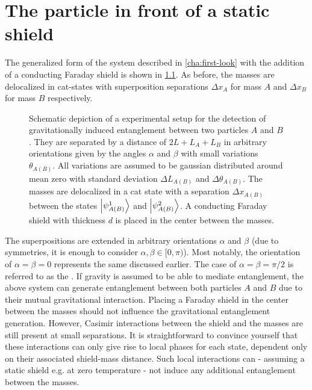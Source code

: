 \chapter{The particle in front of a static shield}\label{cha:entanglement-generation}

The generalized form of the system described in \cref{cha:first-look} with the addition of a conducting Faraday shield is shown in \cref{fig:4:complete-setup}. As before, the masses are delocalized in cat-states with superposition separations $\Delta x_A$ for mass $A$ and $\Delta x_B$ for mass $B$ respectively.
\begin{figure}[!htbp]
  \centering
  \def\svgwidth{\textwidth}
  
  \caption{Schematic depiction of a experimental setup for the detection of gravitationally induced entanglement between two particles $A$ and $B$. They are separated by a distance of $2L + L_A + L_B$ in arbitrary orientations given by the angles $\alpha$ and $\beta$ with small variations $\theta_{A(B)}$. All variations are assumed to be gaussian distributed around mean zero with standard deviation $\Delta L_{A(B)}$ and $\Delta \theta_{A(B)}$. The masses are delocalized in a cat state with a separation $\Delta x_{A(B)}$ between the states $\ket{\psi_{A(B)}^1}$ and $\ket{\psi_{A(B)}^2}$. A conducting Faraday shield with thickness $d$ is placed in the center between the masses.}
  \label{fig:4:complete-setup}
\end{figure}
The superpositions are extended in arbitrary orientations $\alpha$ and $\beta$ (due to symmetries, it is enough to consider $\alpha, \beta \in [0, \pi)$). Most notably, the orientation of $\alpha = \beta = 0$ represents the same  discussed earlier. 
The case of $\alpha = \beta = \pi/2$ is referred to as the .
If gravity is assumed to be able to mediate entanglement, the above system can generate entanglement between both particles $A$ and $B$ due to their mutual gravitational interaction.
Placing a Faraday shield in the center between the masses should not influence the gravitational entanglement generation.
However, Casimir interactions between the shield and the masses are still present at small separations.
It is straightforward to convince yourself that these interactions can only give rise to local phases for each state, dependent only on their associated shield-mass distance.
Such local interactions can - assuming a static shield e.g. at zero temperature - not induce any additional entanglement between the masses.

